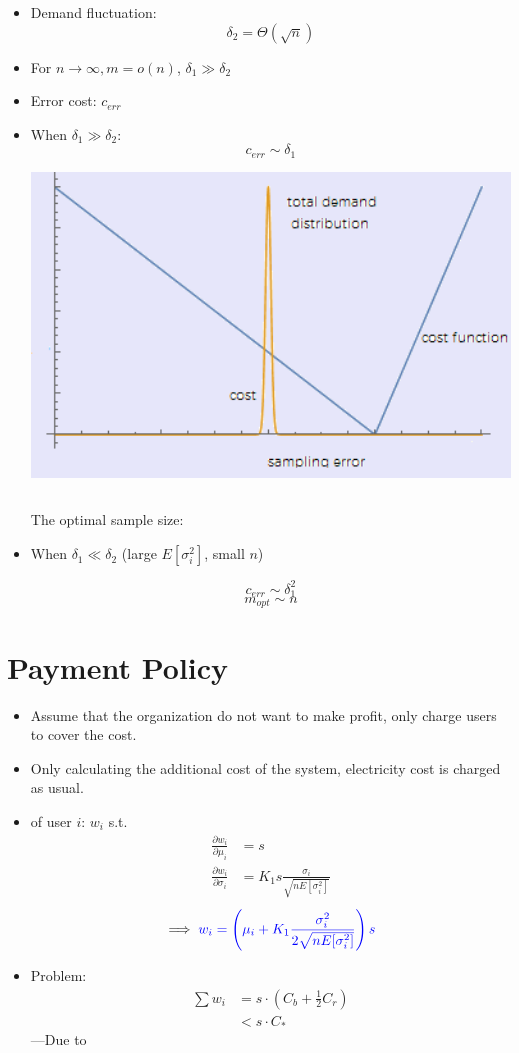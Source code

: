 \documentclass[a0,portrait]{a0poster}
\begin{document}
\begin{multicols}{2}
\begin{itemize}
\item Demand fluctuation:
 $$\delta_2=\Theta(\sqrt{n})$$
\item For $n\to\infty,m=o(n)$, $\delta_1\gg\delta_2$
\item Error cost: $c_{err}$
\item When $\delta_1\gg\delta_2$:
 $$ c_{err}\sim\delta_1 $$
 $$ $$
\begin{center}
\includegraphics[width=20cm]{error.png}
\end{center}
 $$ $$

The optimal sample size:
\item When $\delta_1\ll\delta_2$ (large $E[\sigma_i^2]$, small $n$)

$$ c_{err}\sim\delta_1^2 $$
 $$ m_{opt}\sim n$$

 
\end{itemize}

\section* {Payment Policy}
\begin{itemize}
\item Assume that the organization do not want to make profit, only charge users to cover the cost.
\item Only calculating the additional cost of the system, electricity cost is charged as usual.
\item {} of user $i$: $w_i$ s.t.
\begin{align*}
 \frac{\partial w_i}{\partial \mu_i} &= s  \\
 \frac{\partial w_i}{\partial \sigma_i} &= K_1 s \frac{\sigma_i}{\sqrt{nE[\sigma_i^2]}} 
\end{align*}
$$ \implies \textcolor{blue}{w_i=\left(\mu_i+K_1\frac{\sigma_i^2}{2\sqrt{nE[\sigma_i^2]}}\right)s} $$
\item Problem:
\begin{align*}
 \sum w_i &= s\cdot\left( C_b+\frac{1}{2}C_r \right) \\
          &< s\cdot C_*
\end{align*}
---Due to 


\end{itemize}
\end{multicols}
\end{document}
